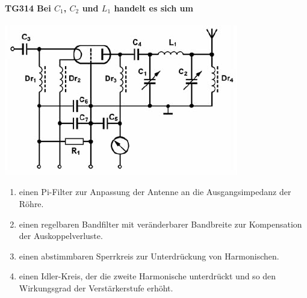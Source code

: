 \documentclass[8pt]{article}
\begin{document}
\paragraph*{TG314 Bei $C_{1}$, $C_{2}$ und $L_{1}$ handelt es sich um}
\begin{center}
	\begin{minipage}{\linewidth}
		\centering
		\includegraphics[scale=1.0]{pics/tg314_a.jpg}
	\end{minipage}
\end{center}
\begin{enumerate}[nolistsep,label=\Alph*]
\item einen Pi-Filter zur Anpassung der Antenne an die Ausgangsimpedanz der Röhre.
\item einen regelbaren Bandfilter mit veränderbarer Bandbreite zur Kompensation der Auskoppelverluste.
\item einen abstimmbaren Sperrkreis zur Unterdrückung von Harmonischen.
\item einen Idler-Kreis, der die zweite Harmonische unterdrückt und so den Wirkungsgrad der Verstärkerstufe erhöht.
\end{enumerate}
\end{document}
